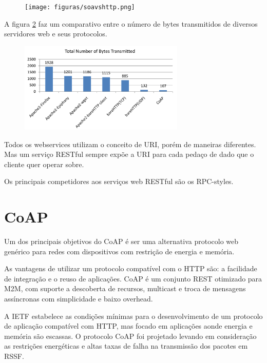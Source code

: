 \begin{figure}[h]
    \label{soaVsHttp}
    \centering
    \texttt{[image: figuras/soavshttp.png]}
    \caption{\cite{richardson2008restful}}
\end{figure}

A figura \ref{bytesTransmitted} faz um comparativo entre o n\'umero de bytes transmitidos de diversos servidores web e seus protocolos.

\begin{figure}[h]
    \label{bytesTransmitted}
    \centering
    \includegraphics[width=0.7\textwidth]{figuras/bytestransmitted.png}
    \caption{\cite{transportApp}}
\end{figure}

Todos os webservices utilizam o conceito de URI, por\'em de maneiras diferentes. Mas um servi\c{c}o RESTful sempre exp\~oe a URI para cada peda\c{c}o de dado que o cliente quer operar sobre.

Os principais competidores aos servi\c{c}os web RESTful s\~ao os RPC-styles.

\section{CoAP}

Um dos principais objetivos do CoAP \'e ser uma alternativa protocolo web gen\'erico para redes com dispositivos com restri\c{c}\~ao de energia e mem\'oria.

As vantagens de utilizar um protocolo compat\'ivel com o HTTP s\~ao: a facilidade de integra\c{c}\~ao e o reuso de aplica\c{c}\~oes. CoAP \'e um conjunto REST otimizado para M2M, com suporte a descoberta de recursos, multicast e troca de mensagens ass\'incronas com simplicidade e baixo overhead.

A IETF estabelece as condi\c{c}\~oes m\'inimas para o desenvolvimento de um protocolo de aplica\c{c}\~ao compat\'ivel com HTTP, mas focado em aplica\c{c}\~oes aonde energia e mem\'oria s\~ao escassas. O protocolo CoAP foi projetado levando em considera\c{c}\~ao as restri\c{c}\~oes energ\'eticas e altas taxas de falha na transmiss\~ao dos pacotes em RSSF.

